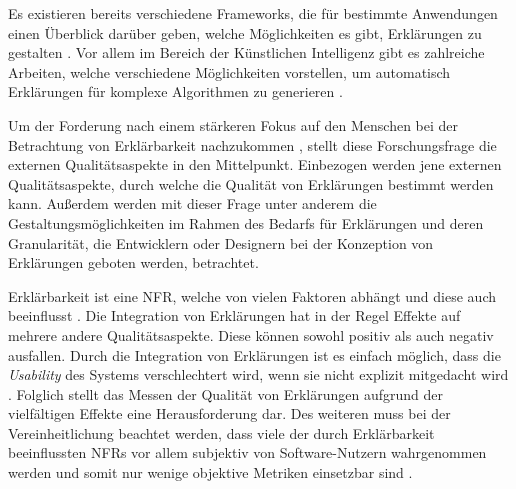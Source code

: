 \smallskip

\noindent{}

\smallskip

Es existieren bereits verschiedene Frameworks, die für bestimmte Anwendungen einen Überblick darüber geben, welche Möglichkeiten es gibt, Erklärungen zu gestalten \cite{nunes_systematic_2017}. Vor allem im Bereich der Künstlichen Intelligenz gibt es zahlreiche Arbeiten, welche verschiedene Möglichkeiten vorstellen, um automatisch Erklärungen für komplexe Algorithmen zu generieren \cite{sokol_explainability_2020, mahoney2019framework}.

Um der Forderung nach einem stärkeren Fokus auf den Menschen bei der Betrachtung von Erklärbarkeit nachzukommen \cite{ehsan_operationalizing_2021}, stellt diese Forschungsfrage die externen Qualitätsaspekte \cite{international2011iso} in den Mittelpunkt. Einbezogen werden jene externen Qualitätsaspekte, durch welche die Qualität von Erklärungen bestimmt werden kann. Außerdem werden mit dieser Frage unter anderem die Gestaltungsmöglichkeiten im Rahmen des Bedarfs für Erklärungen und deren Granularität, die Entwicklern oder Designern bei der Konzeption von Erklärungen geboten werden, betrachtet. 


\smallskip

\noindent{}

\smallskip

Erklärbarkeit ist eine NFR, welche von vielen Faktoren abhängt und diese auch beeinflusst \cite{chazette_knowledge_nodate}. Die Integration von Erklärungen hat in der Regel Effekte auf mehrere andere Qualitätsaspekte. Diese können sowohl positiv als auch negativ ausfallen. Durch die Integration von Erklärungen ist es einfach möglich, dass die \textit{Usability} des Systems verschlechtert wird, wenn sie nicht explizit mitgedacht wird \cite{sokol_explainability_2020}. Folglich stellt das Messen der Qualität von Erklärungen aufgrund der vielfältigen Effekte eine Herausforderung dar. Des weiteren muss bei der Vereinheitlichung beachtet werden, dass viele der durch Erklärbarkeit beeinflussten NFRs vor allem subjektiv von Software-Nutzern wahrgenommen werden und somit nur wenige objektive Metriken einsetzbar sind \cite{sokol_explainability_2020}.

